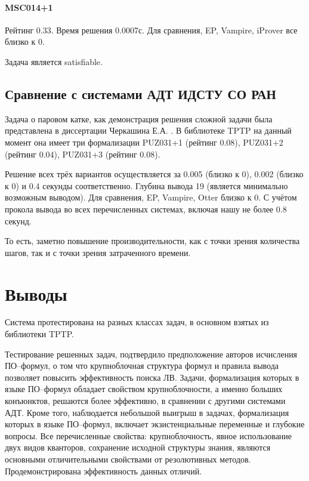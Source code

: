 \paragraph{MSC014+1}
Рейтинг 0.33. Время решения 0.0007с. Для сравнения, EP, Vampire, iProver все близко к 0.

Задача является satisfiable.

\subsection{Сравнение с системами АДТ ИДСТУ СО РАН}
Задача о паровом катке, как демонстрация решения сложной задачи была представлена в диссертации Черкашина Е.А. \cite{dissChe}.
В библиотеке TPTP на данный момент она имеет три формализации PUZ031+1 (рейтинг 0.08), PUZ031+2 (рейтинг 0.04), PUZ031+3 (рейтинг 0.08).

Решение всех трёх вариантов осуществляется за 0.005 (близко к 0), 0.002 (близко к 0) и 0.4 секунды соответственно. Глубина вывода 19 (является минимально возможным выводом). Для сравнения, EP, Vampire, Otter близко к 0. С учётом прокола вывода во всех перечисленных системах, включая нашу не более 0.8 секунд.

То есть, заметно повышение производительности, как с точки зрения количества шагов, так и с точки зрения затраченного времени.



\section{Выводы}
Система протестирована на разных классах задач, в основном взятых из библиотеки TPTP.  

Тестирование решенных задач, подтвердило предположение авторов исчисления ПО--формул, о том что крупноблочная структура формул и правила вывода позволяет повысить эффективность поиска ЛВ. Задачи, формализация которых в языке ПО--формул обладает свойством крупноблочности, а именно больших конъюнктов, решаются более эффективно, в сравнении с другими системами АДТ. Кроме того, наблюдается небольшой выигрыш в задачах, формализация которых в языке ПО--формул, включает экзистенциальные переменные и глубокие вопросы. Все перечисленные свойства: крупноблочность, явное использование двух видов кванторов, сохранение исходной структуры знания, являются основными отличительными свойствами от резолютивных методов. Продемонстрирована эффективность данных отличий.

